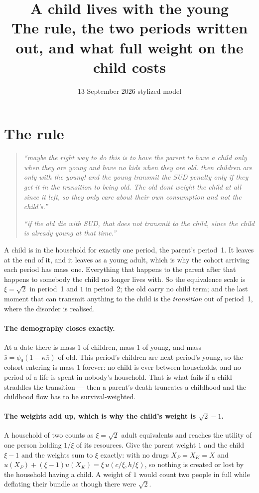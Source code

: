 \documentclass[11pt]{article}
\title{\textbf{A child lives with the young}\\[2pt]
\large The rule, the two periods written out, and what full weight on the child costs}
\author{}
\date{13 September 2026 \quad\textbullet\quad stylized model}
\begin{document}
\maketitle\vspace{-2.5em}

\section{The rule}

\begin{quote}
\emph{``maybe the right way to do this is to have the parent to have a child only
when they are young and have no kids when they are old. then children are only
with the young! and the young transmit the SUD penalty only if they get it in
the transition to being old. The old dont weight the child at all since it left,
so they only care about their own consumption and not the child's.''}

\emph{``if the old die with SUD, that does not transmit to the child, since the
child is already young at that time.''}
\end{quote}

\noindent A child is in the household for exactly one period, the parent's
period~1. It leaves at the end of it, and it leaves as a young adult, which is
why the cohort arriving each period has mass one. Everything that happens to the
parent after that happens to somebody the child no longer lives with. So the
equivalence scale is $\xi=\sqrt2$ in period~1 and $1$ in period~2; the old carry
no child term; and the last moment that can transmit anything to the child is
the \emph{transition} out of period~1, where the disorder is realised.

\paragraph{The demography closes exactly.} At a date there is mass $1$ of
children, mass $1$ of young, and mass $\bar s=\phi_0(1-\kappa\bar\pi)$ of old.
This period's children are next period's young, so the cohort entering is mass
$1$ forever: no child is ever between households, and no period of a life is
spent in nobody's household. That is what fails if a child straddles the
transition --- then a parent's death truncates a childhood and the childhood
flow has to be survival-weighted.

\paragraph{The weights add up, which is why the child's weight is $\sqrt2-1$.}
A household of two counts as $\xi=\sqrt2$ adult equivalents and reaches the
utility of one person holding $1/\xi$ of its resources. Give the parent weight
$1$ and the child $\xi-1$ and the weights sum to $\xi$ exactly: with no drugs
$X_P=X_K=X$ and $u(X_P)+(\xi-1)u(X_K)=\xi\,u(c/\xi,h/\xi)$, so nothing is
created or lost by the household having a child. A weight of $1$ would count two
people in full while deflating their bundle as though there were $\sqrt2$.
\end{document}
